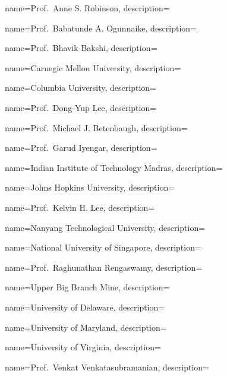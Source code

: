 	{
		name={Prof.~Anne S. Robinson},
		description={}
	}
	
	{
		name={Prof.~Babatunde A. Ogunnaike},
		description={}
	}	

	{
		name={Prof.~Bhavik Bakshi},
		description={}
	}

	{
		name={Carnegie Mellon University},
		description={}
	}	
	
	{
		name={Columbia University},
		description={}
	}	

	{
		name={Prof.~Dong-Yup Lee},
		description={}
	}	
	
	{
		name={Prof.~Michael J. Betenbaugh},
		description={}		
	}

	{
		name={Prof.~Garud Iyengar},
		description={}
	}	
	
	{
		name={Indian Institute of Technology Madras},
		description={}
	}	
	
	{
		name={Johns Hopkins University},
		description={}
	}		

	{
		name={Prof.~Kelvin H. Lee},
		description={}
	}	

	{
		name={Nanyang Technological University},
		description={}
	}	

	{
		name={National University of Singapore},
		description={}
	}	

	{
		name={Prof.~Raghunathan Rengaswamy},
		description={}
	}
	
	{
		name={Upper Big Branch Mine},
		description={}
	}
	
	{
		name={University of Delaware},
		description={}
	}	

	{
		name={University of Maryland},
		description={}
	}	
	
	{
		name={University of Virginia},
		description={}
	}			

	{
		name={Prof.~Venkat Venkatasubramanian},
		description={}
	}


